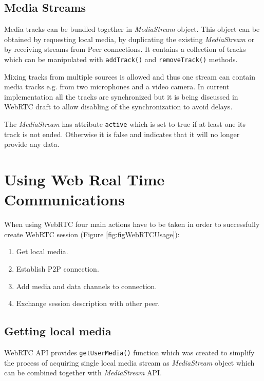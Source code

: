 \subsection{Media Streams}
Media tracks can be bundled together in \textit{MediaStream} object. This object can be obtained by requesting local media, by duplicating the existing \textit{MediaStream} or by receiving streams from Peer connections. It contains a collection of tracks which can be manipulated with \verb|addTrack()| and \verb|removeTrack()| methods.

Mixing tracks from multiple sources is allowed and thus one stream can contain media tracks e.g. from two microphones and a video camera. In current implementation all the tracks are synchronized but it is being discussed in WebRTC draft \cite{webrtc-media-draft} to allow disabling of the synchronization to avoid delays.

The \textit{MediaStream} has attribute \verb|active| which is set to true if at least one its track is not ended. Otherwise it is false and indicates that it will no longer provide any data.








\section{Using Web Real Time Communications}
When using WebRTC four main actions have to be taken in order to successfully create WebRTC session (Figure \ref{fig:figWebRTCUsage}):

\begin{enumerate}
	\item Get local media.
    \item Establish P2P connection.
    \item Add media and data channels to connection.
    \item Exchange session description with other peer.
\end{enumerate}


\subsection{Getting local media}
WebRTC API provides \verb|getUserMedia()| function which was created to simplify the process of acquiring single local media stream as \textit{MediaStream} object which can be combined together with \textit{MediaStream} API.

